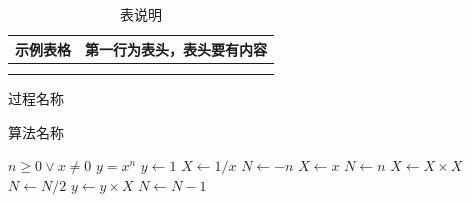 \documentclass{cjc}
\begin{document}
\begin{table}[htb]
  \centering
  \caption{表说明}
  \small
  \begin{tabular}{cc}
    \toprule
    示例表格 & 第一行为表头，表头要有内容 \\
    \midrule
         &               \\
    \midrule
         &               \\
    \bottomrule
  \end{tabular}
\end{table}

\begin{procedure}
  \caption{过程名称}
  \small
  \begin{algorithmic}
    \REQUIRE
    \ENSURE
    \STATE {}
  \end{algorithmic}
\end{procedure}

\begin{algorithm}
  \caption{算法名称}
  \small
  \begin{algorithmic}
    \REQUIRE $n \geq 0 \vee x \neq 0$
    \ENSURE $y = x^n$
    \STATE $y \leftarrow 1$
    \STATE $X \leftarrow 1 / x$
    \STATE $N \leftarrow -n$
    \ELSE
    \STATE $X \leftarrow x$
    \STATE $N \leftarrow n$
    \ENDIF
    \STATE $X \leftarrow X \times X$
    \STATE $N \leftarrow N / 2$
    \ELSE[$N$ is odd]
    \STATE $y \leftarrow y \times X$
    \STATE $N \leftarrow N - 1$
    \ENDIF
    \ENDWHILE
  \end{algorithmic}
\end{algorithm}

\nocite{*}



\end{document}
